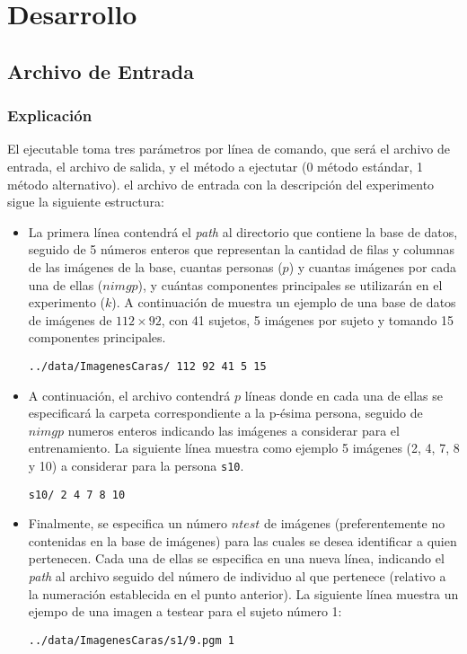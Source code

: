 \section{Desarrollo}
\subsection{Archivo de Entrada}
\subsubsection{Explicaci\'on}
El ejecutable toma tres par\'ametros por l\'inea de comando, que ser\'a el archivo de entrada, el archivo de salida, y el m\'etodo a
ejectutar (0 m\'etodo est\'andar, 1 m\'etodo alternativo).
el archivo de entrada con la descripci\'on del experimento sigue la siguiente
estructura:
\begin{itemize}
\item La primera l\'inea contendr\'a el \emph{path} al directorio que contiene la base de datos, seguido de 5 n\'umeros
enteros que representan la cantidad de filas y columnas de las im\'agenes de la base, cuantas personas ($p$) y cuantas
im\'agenes por cada una de ellas ($nimgp$), y cu\'antas componentes principales se utilizar\'an en el experimento ($k$). 
A continuaci\'on de muestra un ejemplo de una base de datos de im\'agenes de $112 \times 92$, con 41 sujetos, 5 
im\'agenes por sujeto y tomando 15 componentes principales.

\begin{verbatim}
../data/ImagenesCaras/ 112 92 41 5 15
\end{verbatim}

\item A continuaci\'on, el archivo contendr\'a $p$ l\'ineas donde en cada una de ellas se especificar\'a la carpeta
correspondiente a la p-\'esima persona, seguido de $nimgp$ numeros enteros indicando las im\'agenes a considerar para el
entrenamiento. La siguiente l\'inea muestra como ejemplo 5 im\'agenes (2, 4, 7, 8 y 10) a considerar para la persona
\verb+s10+.

\begin{verbatim}
s10/ 2 4 7 8 10
\end{verbatim}

\item Finalmente, se especifica un n\'umero $ntest$ de im\'agenes (preferentemente no contenidas en la base de
im\'agenes) para las cuales se desea identificar a quien pertenecen. Cada una de ellas se especifica en una nueva
l\'inea, indicando el \emph{path} al archivo seguido del n\'umero de individuo al que pertenece (relativo a la
numeraci\'on establecida en el punto anterior). La siguiente l\'inea muestra un ejempo de una imagen a testear para el
sujeto n\'umero 1:

\begin{verbatim}
../data/ImagenesCaras/s1/9.pgm 1
\end{verbatim}
\end{itemize}

